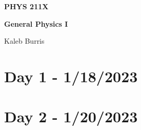 \documentclass[12pt, letterpaper]{book}
\begin{document}
    \begin{titlepage}
        \Huge \textbf{PHYS 211X}

        \huge \textbf{General Physics I}

        \vfill

        \Large Kaleb Burris
    \end{titlepage}

    \section*{Day 1 - 1/18/2023}

    

    \section*{Day 2 - 1/20/2023}

    
\end{document}
